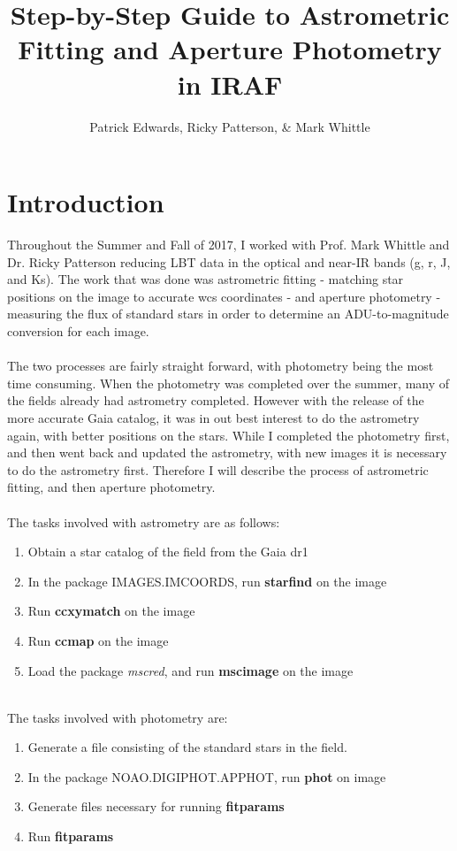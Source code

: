 \documentclass[a4paper]{article}
\title{Step-by-Step Guide to Astrometric Fitting and Aperture Photometry in IRAF}
\author{Patrick Edwards, Ricky Patterson, \& Mark Whittle}
\begin{document}
\maketitle

\section{Introduction}
Throughout the Summer and Fall of 2017, I worked with Prof. Mark Whittle and Dr. Ricky Patterson reducing LBT data in the optical and near-IR bands (g, r, J, and Ks).  The work that was done was astrometric fitting - matching star positions on the image to accurate wcs coordinates - and aperture photometry - measuring the flux of standard stars in order to determine an ADU-to-magnitude conversion for each image.  \\ \\
The two processes are fairly straight forward, with photometry being the most time consuming.  When the photometry was completed over the summer, many of the fields  already had astrometry completed.  However with the release of the more accurate Gaia catalog, it was in out best interest to do the astrometry again, with better positions on the stars.  While I completed the photometry first, and then went back and updated the astrometry, with new images it is necessary to do the astrometry first.  Therefore I will describe the process of astrometric fitting, and then aperture photometry.
\\ \\
The tasks involved with astrometry are as follows:
\begin{enumerate}
\item Obtain a star catalog of the field from the Gaia dr1
\item In the package IMAGES.IMCOORDS, run \textbf{starfind} on the image
\item Run \textbf{ccxymatch} on the image
\item Run \textbf{ccmap} on the image
\item Load the package \textit{mscred}, and run \textbf{mscimage} on the image
\end{enumerate}
\\
The tasks involved with photometry are:
\begin{enumerate}
\item Generate a file consisting of the standard stars in the field.
\item In the package NOAO.DIGIPHOT.APPHOT, run \textbf{phot} on image
\item Generate files necessary for running \textbf{fitparams}
\item Run \textbf{fitparams}
\end{enumerate}
\end{document}
